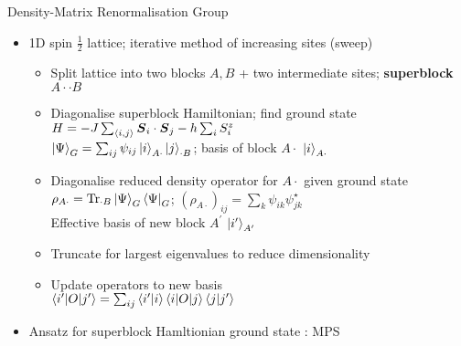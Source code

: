 \documentclass{beamer}
\begin{document}

\begin{frame}{Density-Matrix Renormalisation Group}
	\begin{itemize}
	\item 1D spin $\frac{1}{2}$ lattice; iterative method of increasing sites (sweep)
	\begin{itemize}
		\item Split lattice into two blocks $A,B$ + two intermediate sites; \textbf{superblock} $A\cdot\cdot B$ %
		\item Diagonalise superblock Hamiltonian; find ground state $H=-J\sum_{\ev{i,j}}^{} \boldsymbol{S}_{i}\cdot\boldsymbol{S}_{j} -h\sum_{i}^{} S^z_{i}$\\
			$\ket{\Psi }_{G}=\sum_{ij}^{} \psi_{ij}\ket{i}_{A\cdot}\ket{j}_{\cdot B}$; basis of block $A\cdot$ $\ket{i}_{A\cdot}$
		\item Diagonalise reduced density operator for $A\cdot$ given ground state \\
			$\rho_{A\cdot}=\text{Tr}_{\cdot B}\ket{\Psi}_G\bra{\Psi}_G$; $(\rho_{A\cdot})_{ij}=\sum_{k}\psi_{ik}\psi^\star_{jk}$\\
			Effective basis of new block $A^{\prime}$ $\ket{i^{\prime}}_{A^{\prime}}$
		\item Truncate for largest eigenvalues to reduce dimensionality
		\item Update operators to new basis\\
			$\ev{i^{\prime}| O|j^{\prime}}=\sum_{ij} \ev{i^{\prime}|i}\ev{i|O|j}\ev{j|j^{\prime}}$
	\end{itemize}
\item Ansatz for superblock Hamltionian ground state : MPS
\end{itemize}
\end{frame}
\end{document}
